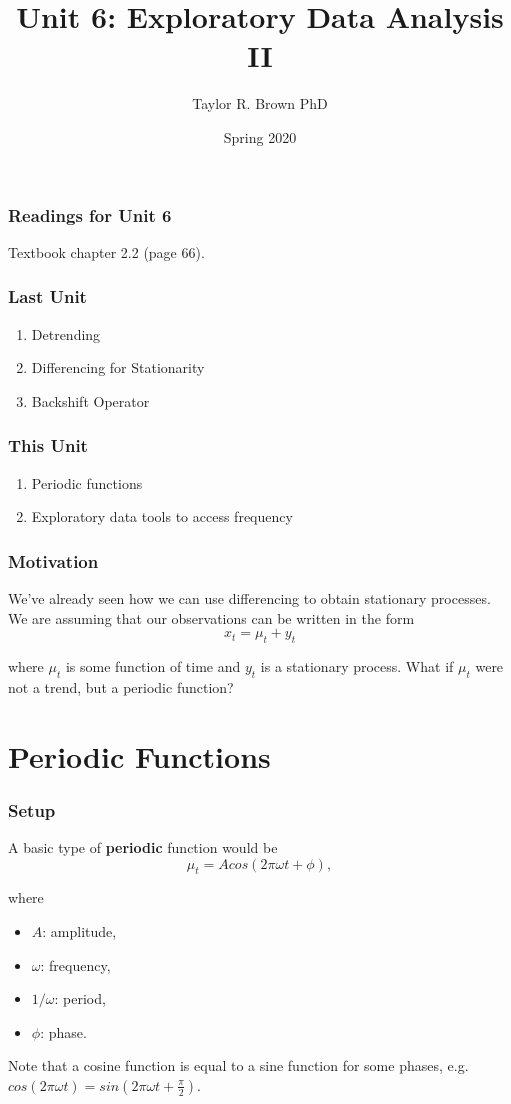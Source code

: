 \documentclass[%
xcolor=pdftex]{beamer}
\title{Unit 6: Exploratory Data Analysis II}
\author[STAT 5170: Applied Time Series, Unit 6]{Taylor R. Brown PhD}
\institute{Department of Statistics, University of Virginia}
\date{Spring 2020}
\begin{document}
\frame{\titlepage}


\begin{frame}
\frametitle{Readings for Unit 6}

Textbook chapter 2.2 (page 66).

\end{frame}


\begin{frame}
\frametitle{Last Unit}
\begin{enumerate}
\item Detrending
\item Differencing for Stationarity
\item Backshift Operator
\end{enumerate}
\end{frame}

\begin{frame}
\frametitle{This Unit}
\begin{enumerate}
\item Periodic functions
\item Exploratory data tools to access frequency
\end{enumerate}
\end{frame}

\begin{frame}
\frametitle{Motivation}

We've already seen how we can use differencing to obtain stationary processes.  We are assuming that our observations can be written in the form
\begin{equation} \label{eq:basic}
x_t=\mu_t+y_t
\end{equation}

where $\mu_t$ is some function of time and $y_t$ is a
stationary process. What if $\mu_t$ were not a
trend, but a periodic function?

\end{frame}

\section{Periodic Functions}
\frame{\tableofcontents[currentsection]}

\begin{frame}
\frametitle{Setup}

A basic type of \textbf{periodic}
function would be
$$
\mu_t=A cos( 2 \pi \omega t + \phi),
$$

where

\begin{itemize}
\item $A$: amplitude,
\item $\omega$: frequency,
\item $1/\omega$: period,
\item $\phi$: phase.
\end{itemize}

Note that a cosine function is equal to a sine function for some phases, e.g. $cos(2 \pi \omega t)  = sin(2 \pi \omega t + \frac{\pi}{2})$.

\end{frame}
\end{document}
